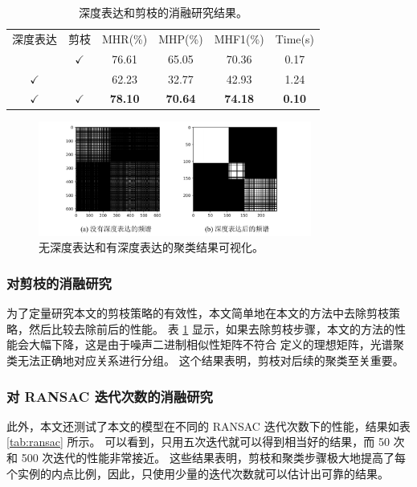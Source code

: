 \setlength{\tabcolsep}{2pt}
\begin{table}
  \caption{
    深度表达和剪枝的消融研究结果。
    }
  \centering
  \begin{tabular}{cccccc}
    \hline\noalign{\smallskip}
    深度表达 & 剪枝 & MHR(\%)         & MHP(\%)         & MHF1(\%)         & Time(s)       \\
  \noalign{\smallskip}
  \hline
  \noalign{\smallskip}
  & $\checkmark$       & 76.61          & 65.05          & 70.36          & 0.17          \\
  $\checkmark$                   &         & 62.23          & 32.77          & 42.93          & 1.24          \\
  $\checkmark$                &
 $\checkmark$     & \textbf{78.10} & \textbf{70.64} & \textbf{74.18} & \textbf{0.10}\\
  \hline
  \end{tabular}
  \label{tab:ablation}
\end{table}
\setlength{\tabcolsep}{1.4pt}


\begin{figure}
  \centering
  \includegraphics[width=0.8\textwidth]{images/spectral.pdf}
  \caption{
    无深度表达和有深度表达的聚类结果可视化。
    }
    \vspace{-0.5cm}
  \label{fig:spectral}
\end{figure}

\subsubsection{对剪枝的消融研究}
为了定量研究本文的剪枝策略的有效性，本文简单地在本文的方法中去除剪枝策略，然后比较去除前后的性能。
表 \ref{tab:ablation} 显示，如果去除剪枝步骤，本文的方法的性能会大幅下降，这是由于噪声二进制相似性矩阵不符合 \cite{li2007noise} 定义的理想矩阵，光谱聚类无法正确地对应关系进行分组。
这个结果表明，剪枝对后续的聚类至关重要。

\subsubsection{对 RANSAC 迭代次数的消融研究}
\vspace{-0.3cm}
此外，本文还测试了本文的模型在不同的 RANSAC 迭代次数下的性能，结果如表 \ref{tab:ransac} 所示。
可以看到，只用五次迭代就可以得到相当好的结果，而 50 次和 500 次迭代的性能非常接近。
这些结果表明，剪枝和聚类步骤极大地提高了每个实例的内点比例，因此，只使用少量的迭代次数就可以估计出可靠的结果。


